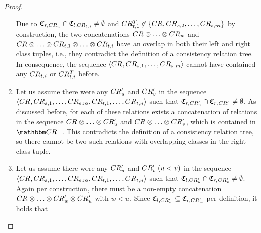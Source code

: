 \begin{proof}
\begin{enumerate}
    Due to $\mathfrak{C}_{r,CR_{w}} \cap \mathfrak{C}_{l,CR_{t,i}} \neq \emptyset$ and  $CR^T_{t,1} \not\in \{ CR_{}, CR_{s,2}, \dots, CR_{s,m} \}$ by construction, the two concatenations $\consistencyrelation{CR}{} \concat \dots \concat \consistencyrelation{CR}{w}$ and $\consistencyrelation{CR}{} \concat \dots \concat \consistencyrelation{CR}{t,1} \concat \dots \concat \consistencyrelation{CR}{t,i}$ have an overlap in both their left and right class tuples, i.e., they contradict the definition of a consistency relation tree.
    In consequence, the sequence $\langle CR_{}, CR_{s,1}, \dots, CR_{s,m} \rangle$ cannot have contained any $CR_{t,i}$ or $CR^T_{t,i}$ before.
        \item 
    Let us assume there were any $CR'_{u}$ and $CR'_{v}$ in the sequence $\langle CR_{}, CR_{s,1}, \dots, CR_{s,m}, CR_{t,1}, \dots, CR_{t,n} \rangle$ such that $\mathfrak{C}_{r,CR'_{u}} \cap \mathfrak{C}_{r,CR'_{v}} \neq \emptyset$.
    As discussed before, for each of these relations exists a concatenation of relations in the sequence $\consistencyrelation{CR}{} \concat \dots \concat \consistencyrelation{CR'}{u}$ and $\consistencyrelation{CR}{} \concat \dots \concat \consistencyrelation{CR'}{v}$, which is contained in $\transitiveclosure{\consistencyrelationset{CR}}$.
    This contradicts the definition of a consistency relation tree, so there cannot be two such relations with overlapping classes in the right class tuple.
        \item
    Let us assume there were any $CR'_{u}$ and $CR'_{v}\; (u < v)$ in the sequence $\langle CR_{}, CR_{s,1}, \dots, CR_{s,m}, CR_{t,1}, \dots, CR_{t,n} \rangle$ such that $\mathfrak{C}_{l,CR'_{u}} \cap \mathfrak{C}_{r,CR'_{v}} \neq \emptyset$.
    Again per construction, there must be a non-empty concatenation $\consistencyrelation{CR}{} \concat \dots \concat \consistencyrelation{CR'}{w} \concat \consistencyrelation{CR'}{u}$ with $w < u$. Since $\mathfrak{C}_{l,CR'_{u}} \subseteq \mathfrak{C}_{r,CR'_{w}}$ per definition, it holds that

\end{enumerate}
\end{proof}
